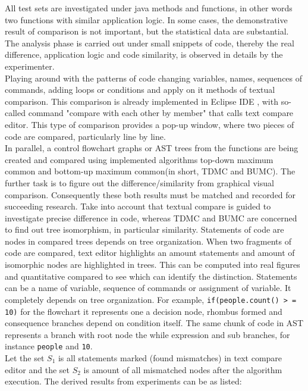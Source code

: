 \documentclass{report}
\begin{document}
All test sets are investigated under java methods and functions, in other words two functions with similar application logic. In some cases, the demonstrative result of comparison is not important, but the statistical data are substantial. The analysis phase is carried out under small snippets of code, thereby the real difference, application logic and code similarity, is observed in details by the experimenter. 
\\
Playing around with the patterns of code changing variables, names, sequences of commands, adding loops or conditions and apply on it methods of textual comparison. This comparison is already implemented in Eclipse IDE \cite{eclipse_site}, with so-called command "compare with each other by member" that calls text compare editor. This type of comparison provides a pop-up window, where two pieces of code are compared, particularly line by line.
\\
In parallel, a control flowchart graphs or AST trees from the functions are being created and compared using implemented algorithms top-down maximum common and bottom-up maximum common(in short, TDMC and BUMC). The further task is to figure out the difference/similarity from graphical visual comparison. Consequently these both results must be matched and recorded for succeeding research. Take into account that textual compare is guided to investigate precise difference in code, whereas TDMC and BUMC are concerned to find out tree isomorphism, in particular similarity. Statements of code are nodes in compared trees depends on tree organization. When two fragments of code are compared, text editor highlights an amount statements and amount of isomorphic nodes are highlighted in trees. This can be computed into real figures and quantitative compared to see which can identify the distinction. Statements can be a name of variable, sequence of commands or assignment of variable. It completely depends on tree organization. For example, \texttt{if(people.count() > = 10)} for the flowchart it represents one a decision node, rhombus formed and consequence branches depend on condition itself. The same chunk of code in AST represents a branch with root node the while expression and sub branches, for instance \texttt{people} and \texttt{10}.
\\
Let the set $S_{1}$ is all statements marked (found mismatches) in text compare editor and the set $S_{2}$ is amount of all mismatched nodes after the algorithm execution.
The derived results from experiments can be as listed: 
\end{document}
